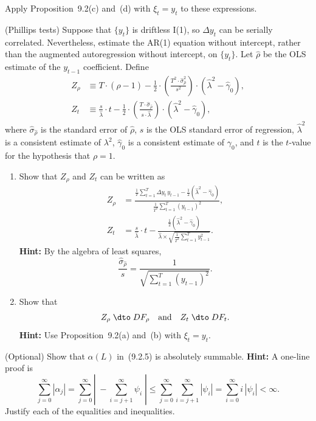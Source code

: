 \begin{problemset}
Apply Proposition~9.2(c) and~(d) with $\xi_t = y_t$ to these expressions.

\exercise[6]
(Phillips tests) \enspace Suppose that $\{y_t\}$ is driftless I(1), so $\Delta y_t$ can be serially correlated. Nevertheless, estimate the AR(1) equation without intercept, rather than
the augmented autoregression without intercept, on $\{y_t\}$. Let $\hat{\rho}$ be the OLS
estimate of the $y_{t-1}$ coefficient. Define
\begin{align*}
Z_\rho &\equiv T \cdot (\hat{\rho} - 1)
- \frac{1}{2} \cdot \left(\frac{T^2 \cdot \hat{\sigma}_{\hat{\rho}}^2}{s^2}\right) \cdot (\hat{\lambda}^2 - \hat{\gamma}_0), \\
Z_t &\equiv \frac{s}{\hat{\lambda}} \cdot t
- \frac{1}{2} \cdot \left(\frac{T \cdot \hat{\sigma}_{\hat{\rho}}}{s \cdot \hat{\lambda}}\right) \cdot (\hat{\lambda}^2 - \hat{\gamma}_0),
\end{align*}
where $\hat{\sigma}_{\hat{\rho}}$ is the standard error of $\hat{\rho}$, $s$ is the OLS standard error of regression,
$\hat{\lambda}^2$ is a consistent estimate of $\lambda^2$, $\hat{\gamma}_0$ is a consistent estimate of $\gamma_0$, and $t$ is the
$t$-value for the hypothesis that $\rho = 1$.

\begin{enumerate}[label=(\alph*)]
\item Show that $Z_\rho$ and $Z_t$ can be written as
\begin{align*}
Z_\rho &= \frac{\frac{1}{T}\sum_{t=1}^{T}\Delta y_t\, y_{t-1}
- \frac{1}{2}(\hat{\lambda}^2 - \hat{\gamma}_0)}{\frac{1}{T^2}\sum_{t=1}^{T}(y_{t-1})^2}, \\
Z_t &= \frac{s}{\hat{\lambda}} \cdot t
- \frac{\frac{1}{2}(\hat{\lambda}^2 - \hat{\gamma}_0)}{\hat{\lambda} \times \sqrt{\frac{1}{T^2}\sum_{t=1}^{T} y_{t-1}^2}}.
\end{align*}
\textbf{Hint:} By the algebra of least squares,
\[
\frac{\hat{\sigma}_{\hat{\rho}}}{s} = \frac{1}{\sqrt{\sum_{t=1}^{T}(y_{t-1})^2}}.
\]

\item Show that
\[
Z_\rho \;\dto\; DF_\rho \quad \text{and} \quad Z_t \;\dto\; DF_t.
\]
\textbf{Hint:} Use Proposition~9.2(a) and~(b) with $\xi_t = y_t$.
\end{enumerate}

\exercise[7]
(Optional) \enspace Show that $\alpha(L)$ in~(9.2.5) is absolutely summable. \textbf{Hint:} A one-line
proof is
\[
\sum_{j=0}^{\infty}|\alpha_j|
= \sum_{j=0}^{\infty}\left|\;-\sum_{i=j+1}^{\infty}\psi_i\;\right|
\leq \sum_{j=0}^{\infty}\sum_{i=j+1}^{\infty}|\psi_i|
= \sum_{i=0}^{\infty} i\,|\psi_i| < \infty.
\]
Justify each of the equalities and inequalities.


\end{problemset}
